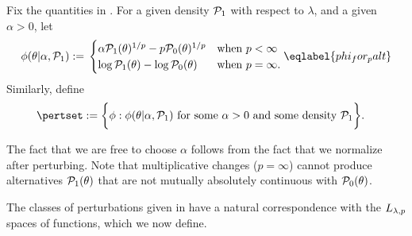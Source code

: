 \begin{defn}
%
Fix the quantities in .  For a given density $\mathcal{P}_{1}$
with respect to $\lambda$, and a given $\alpha > 0$, let
%
\begin{align}
%
\phi(\theta | \alpha, \palt) :={}
\begin{cases}
\alpha \palt(\theta)^{1/p} - p \pbase(\theta)^{1/p}
    & \textrm{when }p < \infty \\
\log \palt(\theta) - \log \pbase(\theta)
    & \textrm{when }p = \infty.
\end{cases} \eqlabel{phi_for_palt}
%
\end{align}
%
Similarly, define
%
\begin{align*}
%
\pertset := \bigg\{&
    \phi:  \phi(\theta | \alpha, \palt) %
    \textrm{ for some }\alpha > 0\textrm{ and some density }\palt
\bigg\}.
%
\end{align*}
%
%
\end{defn}

The fact that we are free to choose $\alpha$ follows from the fact that we
normalize after perturbing.  Note that multiplicative changes ($p=\infty$)
cannot produce alternatives $\mathcal{P}_{1}(\theta)$ that are not mutually absolutely
continuous with $\mathcal{P}_{0}(\theta)$.

The classes of perturbations given in  have a natural
correspondence with the ${L_{\lambda, p}}$ spaces of functions, which we now
define.


